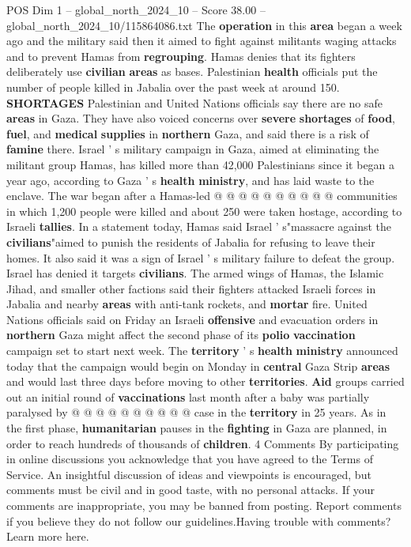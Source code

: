 \begin{textsample}{POS Dim 1 – global\_north\_2024\_10 – Score 38.00 – global\_north\_2024\_10/115864086.txt}
The \textbf{operation} in this \textbf{area} began a week ago and the military said then it aimed to fight against militants waging attacks and to prevent Hamas from \textbf{regrouping}.
Hamas denies that its fighters deliberately use \textbf{civilian} \textbf{areas} as bases.
Palestinian \textbf{health} officials put the number of people killed in Jabalia over the past week at around 150. \textbf{SHORTAGES} Palestinian and United Nations officials say there are no safe \textbf{areas} in Gaza.
They have also voiced concerns over \textbf{severe} \textbf{shortages} of \textbf{food}, \textbf{fuel}, and \textbf{medical} \textbf{supplies} in \textbf{northern} Gaza, and said there is a risk of \textbf{famine} there.
Israel ' s military campaign in Gaza, aimed at eliminating the militant group Hamas, has killed more than 42,000 Palestinians since it began a year ago, according to Gaza ' s \textbf{health} \textbf{ministry}, and has laid waste to the enclave.
The war began after a Hamas-led @ @ @ @ @ @ @ @ @ @ communities in which 1,200 people were killed and about 250 were taken hostage, according to Israeli \textbf{tallies}.
In a statement today, Hamas said Israel ' s"massacre against the \textbf{civilians}"aimed to punish the residents of Jabalia for refusing to leave their homes.
It also said it was a sign of Israel ' s military failure to defeat the group.
Israel has denied it targets \textbf{civilians}.
The armed wings of Hamas, the Islamic Jihad, and smaller other factions said their fighters attacked Israeli forces in Jabalia and nearby \textbf{areas} with anti-tank rockets, and \textbf{mortar} fire.
United Nations officials said on Friday an Israeli \textbf{offensive} and evacuation orders in \textbf{northern} Gaza might affect the second phase of its \textbf{polio} \textbf{vaccination} campaign set to start next week.
The \textbf{territory} ' s \textbf{health} \textbf{ministry} announced today that the campaign would begin on Monday in \textbf{central} Gaza Strip \textbf{areas} and would last three days before moving to other \textbf{territories}. \textbf{Aid} groups carried out an initial round of \textbf{vaccinations} last month after a baby was partially paralysed by @ @ @ @ @ @ @ @ @ @ case in the \textbf{territory} in 25 years.
As in the first phase, \textbf{humanitarian} pauses in the \textbf{fighting} in Gaza are planned, in order to reach hundreds of thousands of \textbf{children}. 4 Comments By participating in online discussions you acknowledge that you have agreed to the Terms of Service.
An insightful discussion of ideas and viewpoints is encouraged, but comments must be civil and in good taste, with no personal attacks.
If your comments are inappropriate, you may be banned from posting.
Report comments if you believe they do not follow our guidelines.Having trouble with comments?
Learn more here.


\end{textsample}
